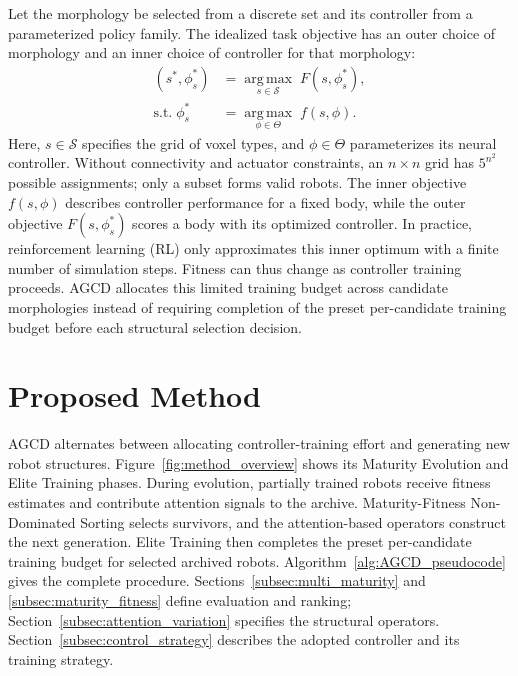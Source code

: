 \documentclass{article}
\begin{document}
    Let the morphology be selected from a discrete set and its controller from
    a parameterized policy family. The idealized task objective has an outer
    choice of morphology and an inner choice of controller for that morphology:
    \begin{equation}
        \begin{aligned}
            (s^{*}, \phi_{s}^{*})      & = \operatorname*{arg\,max}_{s \in \mathcal{S}}\; F\!\left(s, \phi_{s}^{*}\right), \\
            \text{s.t.}\; \phi_{s}^{*} & = \operatorname*{arg\,max}_{\phi \in \Theta}\; f\!\left(s, \phi\right).
        \end{aligned}
        \label{eq:bilevel}
    \end{equation}
    Here, $s\in\mathcal{S}$ specifies the grid of voxel types, and $\phi\in\Theta$
    parameterizes its neural controller. Without connectivity and actuator
    constraints, an $n\times n$ grid has $5^{n^2}$ possible assignments; only
    a subset forms valid robots. The inner objective $f(s,\phi)$ describes
    controller performance for a fixed body, while the outer objective
    $F(s,\phi_s^*)$ scores a body with its optimized controller. In practice,
    reinforcement learning (RL) only approximates this inner optimum with a
    finite number of simulation steps. Fitness can thus change as controller
    training proceeds. AGCD allocates this limited training budget across
    candidate morphologies instead of requiring completion of the preset
    per-candidate training budget before each structural selection decision.

    \section{Proposed Method}
    AGCD alternates between allocating controller-training effort and generating
    new robot structures. Figure~\ref{fig:method_overview} shows its Maturity
    Evolution and Elite Training phases. During evolution, partially trained
    robots receive fitness estimates and contribute attention signals to the
    archive. Maturity-Fitness Non-Dominated Sorting selects survivors, and the
    attention-based operators construct the next generation. Elite Training then
    completes the preset per-candidate training budget for selected archived
    robots. Algorithm~\ref{alg:AGCD_pseudocode}
    gives the complete procedure. Sections~\ref{subsec:multi_maturity} and
    \ref{subsec:maturity_fitness} define evaluation and ranking;
    Section~\ref{subsec:attention_variation} specifies the structural operators.
    Section~\ref{subsec:control_strategy} describes the adopted controller and
    its training strategy.
\end{document}

